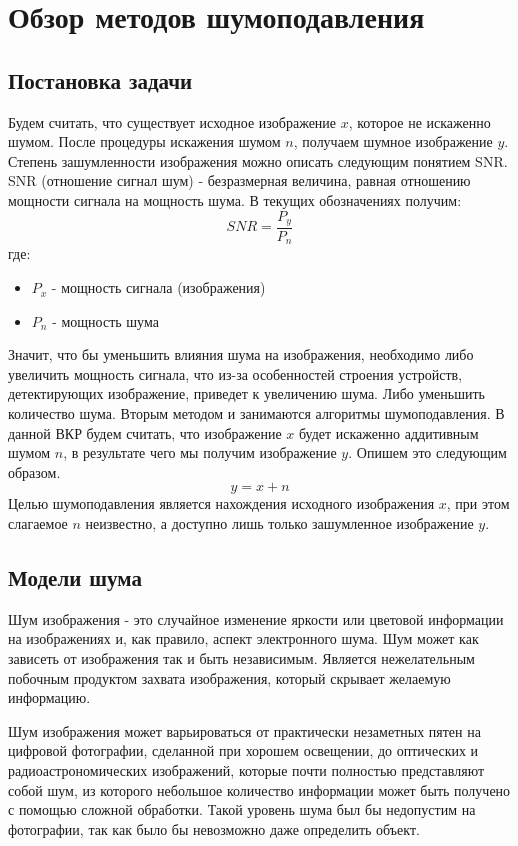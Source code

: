 \section{Обзор методов шумоподавления}
\subsection{Постановка задачи}
Будем считать, что существует исходное изображение $x$, которое не искаженно шумом. После процедуры искажения шумом $n$, получаем шумное изображение $y$. Степень зашумленности изображения можно описать следующим понятием SNR.
SNR (отношение сигнал шум) - безразмерная величина, равная отношению мощности сигнала на мощность шума. В текущих обозначениях получим:
\begin{equation}
	SNR = \frac{P_y}{P_n}
\end{equation} 
где:
\begin{itemize}
	\item $P_x$ - мощность сигнала (изображения)
	\item $P_n$ - мощность шума
\end{itemize}
Значит, что бы уменьшить влияния шума на изображения, необходимо либо увеличить мощность сигнала, что из-за особенностей строения устройств, детектирующих изображение, приведет к увеличению шума. Либо уменьшить количество шума. Вторым методом и занимаются алгоритмы шумоподавления.
В данной ВКР будем считать, что изображение $x$ будет искаженно аддитивным шумом $n$, в результате чего мы получим изображение $y$. Опишем это следующим образом.
\begin{equation}
	y = x + n
\end{equation}
Целью шумоподавления является нахождения  исходного изображения $x$, при этом слагаемое $n$ неизвестно, а доступно лишь только зашумленное изображение $y$.



\subsection{Модели шума}
Шум изображения - это случайное изменение яркости или цветовой информации на изображениях и, как правило, аспект электронного шума. Шум может как зависеть от изображения так и быть независимым. Является нежелательным побочным продуктом захвата изображения, который скрывает желаемую информацию.

Шум изображения может варьироваться от практически незаметных пятен на цифровой фотографии, сделанной при хорошем освещении, до оптических и радиоастрономических изображений, которые почти полностью представляют собой шум, из которого небольшое количество информации может быть получено с помощью сложной обработки. Такой уровень шума был бы недопустим на фотографии, так как было бы невозможно даже определить объект.\cite{Noise}

